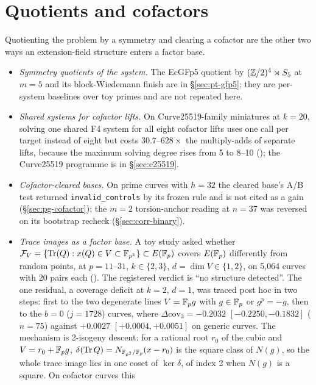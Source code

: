 \section{Quotients and cofactors}\label{sec:glv-quotients}

Quotienting the problem by a symmetry and clearing a cofactor are the
other two ways an extension-field structure enters a factor base.
\begin{itemize}
\item \emph{Symmetry quotients of the system.} The EcGFp5 quotient by
  $(\mathbb{Z}/2)^4\rtimes S_5$ at $m=5$ and its block-Wiedemann finish are in
  \S\ref{sec:pt-gfp5}; they are per-system baselines over toy primes and are
  not repeated here.
\item \emph{Shared systems for cofactor lifts.} On Curve25519-family
  miniatures at $k=20$, solving one shared F4 system for all eight cofactor
  lifts uses one call per target instead of eight but costs $30.7$--$628\times$ the
  multiply-adds of separate lifts, because the maximum solving degree rises
  from 5 to 8--10 ();
  the Curve25519 programme is in \S\ref{sec:c25519}.
\item \emph{Cofactor-cleared bases.} On prime curves with $h=32$ the cleared
  base's A/B test returned \texttt{invalid\_controls} by its frozen rule and is
  not cited as a gain (\S\ref{sec:pg-cofactor}); the $m=2$ torsion-anchor
  reading at $n=37$ was reversed on its bootstrap recheck
  (\S\ref{sec:corr-binary}).
\item \emph{Trace images as a factor base.} A toy study asked whether
  $\mathcal{F}_V=\{\operatorname{Tr}(Q):x(Q)\in V\subset\mathbb{F}_{p^k}\}\subset E(\mathbb{F}_p)$ covers
  $E(\mathbb{F}_p)$ differently from random points, at $p=11$--$31$, $k\in\{2,3\}$,
  $d=\dim V\in\{1,2\}$, on 5{,}064 curves with 20 pairs each
  (). The registered verdict
  is ``no structure detected''. The one residual, a coverage deficit at
  $k=2$, $d=1$, was traced post hoc in two steps: first to the two degenerate
  lines $V=\mathbb{F}_p g$ with $g\in\mathbb{F}_p$ or $g^p=-g$, then to the $b=0$
  ($j=1728$) curves, where $\Delta\mathrm{cov}_3=-0.2032$ $[-0.2250,-0.1832]$
  ($n=75$) against $+0.0027$ $[+0.0004,+0.0051]$ on generic curves. The
  mechanism is 2-isogeny descent: for a rational root $r_0$ of the cubic and
  $V=r_0+\mathbb{F}_p g$, $\delta(\operatorname{Tr}Q)=N_{\mathbb{F}_{p^2}/\mathbb{F}_p}(x-r_0)$ is
  the square class of $N(g)$, so the whole trace image lies in one coset of
  $\ker\delta$, of index 2 when $N(g)$ is a square. On cofactor curves this

\end{itemize}
